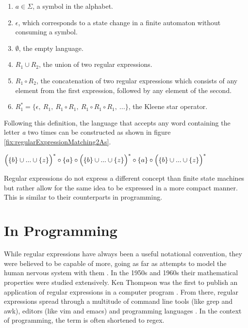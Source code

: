 \begin{enumerate}
    \item $a \in \Sigma$, a symbol in the alphabet. \label{defRegexSymbol}
    \item $\epsilon$, which corresponds to a state change in a finite automaton without consuming a symbol. \label{defRegexEpsilon}
    \item $\emptyset$, the empty language. \label{defRegexEmptyLang}
    \item $R_1 \cup R_2$, the union of two regular expressions. \label{defRegexUnion}
    \item $R_1 \circ R_2$, the concatenation of two regular expressions which consists of any element from the first expression, followed by any element of the second. \label{defRegexConcat}
    \item $R_1^* = \{ \epsilon,\ R_1,\ R_1 \circ R_1,\ R_1 \circ R_1 \circ R_1,\  ... \}$, the Kleene star operator.\label{defRegexKleene}
\end{enumerate}

Following this definition, the language that accepts any word containing the letter \emph{a} two times can be constructed as shown in figure \ref{fix:regularExpressionMatching2As}.

\begin{listingBox}[title={Regular expression that matches any word with two \emph{a}s}, label=fix:regularExpressionMatching2As,width=14cm,center]
    \hspace{-5mm}$\Bigl ( \{b\} \cup ... \cup \{z\} \Bigr )^*\circ\{a\} \circ \Bigl ( \{b\} \cup ... \cup \{z\} \Bigr )^*\circ\{a\} \circ \Bigl ( \{b\} \cup ... \cup \{z\} \Bigr )^*$
\end{listingBox}

Regular expressions do not express a different concept than finite state machines but rather allow for the same idea to be expressed in a more compact manner. This is similar to their counterparts in programming.

\section{In Programming}

While regular expressions have always been a useful notational convention, they were believed to be capable of more, going as far as attempts to model the human nervous system with them \cite[p.~85~ff]{MasteringRegex}. In the 1950s and 1960s their mathematical properties were studied extensively. Ken Thompson was the first to publish an application of regular expressions in a computer program \cite{RegularExpressionSearchAlgorithm}. From there, regular expressions spread through a multitude of command line tools (like grep and awk), editors (like vim and emacs) and programming languages \cite[p.~85]{MasteringRegex}. In the context of programming, the term is often shortened to regex.

